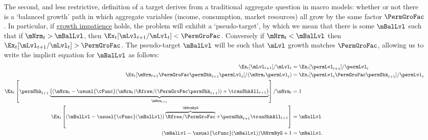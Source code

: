\documentclass[\econtexRoot/BufferStockTheory]{subfiles}
\begin{document}
\hypertarget{Collective-Stability}{}
\hypertarget{pseudo-steady-state}{}


The second, and less restrictive, definition of a target derives from a traditional aggregate question in macro models: whether or not there is a `balanced growth' path in which aggregate variables (income, consumption, market resources) all grow by the same factor $\PermGroFac$.
In particular, if \hyperlink{GICRaw}{growth impatience} holds, the problem will exhibit a `pseudo-target', by which we mean that there is some ${\mBalLvl}$ such that if $\mNrm_{t}>{\mBalLvl}$, then $\Ex_{t}[\mLvl_{t+1}/\mLvl_{t}] < \PermGroFac$.\hypertarget{balgrostable}{}
\hypertarget{balgrostableSolve}{}
Conversely if $\mNrm_{t}<{\mBalLvl}$ then $\Ex_{t}[\mLvl_{t+1}/\mLvl_{t}] > \PermGroFac$.
The pseudo-target $\mBalLvl$ will be such that $\mLvl$ growth matches $\PermGroFac$, allowing us to write the implicit equation for $\mBalLvl$ as follows:
%
\begin{equation}\label{eq:balgrostable}
  \begin{aligned}
    \Ex_{t}[\mLvl_{t+1}]/\mLvl_{t} & =\Ex_{t}[\permLvl_{t+1}]/\permLvl_{t}
    \\  \Ex_{t}[\mNrm_{t+1}\PermGroFac\permShk_{t+1}\permLvl_{t}]/(\mNrm_{t}\permLvl_{t}) & =\Ex_{t}[\permLvl_{t}\PermGroFac\permShk_{t+1}]/\permLvl_{t}
    \\ \Ex_{t}\left[\permShk_{t+1}\underbrace{\left((\mNrm_{t}-\usual{\cFunc}(\mNrm_{t})\Rfree/(\PermGroFac\permShk_{t+1}))+\tranShkAll_{t+1}\right)}_{\mNrm_{t+1}}\right]/\mNrm_{t} & = 1
    \\ 
    \Ex_{t}\left[(\mBalLvl-\usual{\cFunc}(\mBalLvl))\overbrace{\Rfree/\PermGroFac}^{\RNrmByG}+\permShk_{t+1}\tranShkAll_{t+1}\right] & = \mBalLvl
    \\  (\mBalLvl-\usual{\cFunc}(\mBalLvl))\RNrmByG + 1 & = \mBalLvl .
  \end{aligned}
\end{equation}

\end{document}

